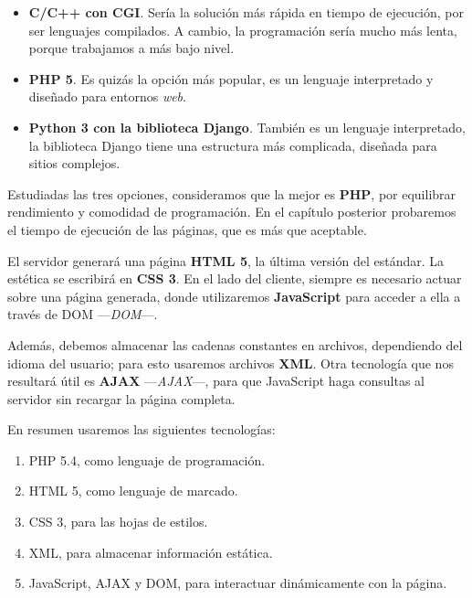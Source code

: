 \begin{itemize}
	\item \textbf{C/C++ con \acrshort{CGI}}. Sería la solución más rápida en tiempo de ejecución, por ser lenguajes compilados. A cambio, la programación sería mucho más lenta, porque trabajamos a más bajo nivel.
	
	\item \textbf{\acrshort{PHP} 5}. Es quizás la opción más popular, es un lenguaje interpretado y diseñado para entornos \textit{web}.
	
	\item \textbf{Python 3 con la biblioteca Django}. También es un lenguaje interpretado, la biblioteca Django tiene una estructura más complicada, diseñada para sitios complejos.
\end{itemize}

Estudiadas las tres opciones, consideramos que la mejor es \textbf{\acrshort{PHP}}, por equilibrar rendimiento y comodidad de programación. En el capítulo posterior probaremos el tiempo de ejecución de las páginas, que es más que aceptable.

El servidor generará una página \textbf{\acrshort{HTML} 5}, la última versión del estándar. La estética se escribirá en \textbf{\acrshort{CSS} 3}. En el lado del cliente, siempre es necesario actuar sobre una página generada, donde utilizaremos \textbf{JavaScript} para acceder a ella a través de \acrshort{DOM} ---\textit{\acrlong{DOM}}---.

Además, debemos almacenar las cadenas constantes en archivos, dependiendo del idioma del usuario; para esto usaremos archivos \textbf{\acrshort{XML}}. Otra tecnología que nos resultará útil es \textbf{\acrshort{AJAX}} ---\textit{\acrlong{AJAX}}---, para que JavaScript haga consultas al servidor sin recargar la página completa.

En resumen usaremos las siguientes tecnologías:

\begin{enumerate}
	\item \acrshort{PHP} 5.4, como lenguaje de programación.
	\item \acrshort{HTML} 5, como lenguaje de marcado.
	\item \acrshort{CSS} 3, para las hojas de estilos.
	\item \acrshort{XML}, para almacenar información estática.
	\item JavaScript, \acrshort{AJAX} y \acrshort{DOM}, para interactuar dinámicamente con la página.
\end{enumerate}

